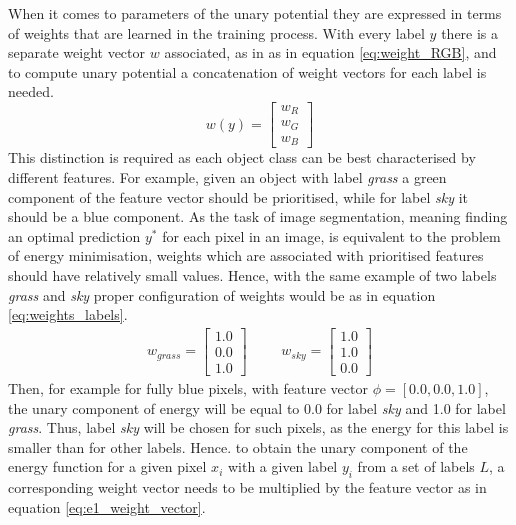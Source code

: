 When it comes to parameters of the unary potential they are expressed in terms of weights that are learned in the training process. With every label $y$ there is a separate weight vector $w$ associated, as in as in equation \ref{eq:weight_RGB}, and to compute unary potential a concatenation of weight vectors for each label is needed.
\begin{equation}
    \label{eq:weight_RGB}
     w(y) = \begin{bmatrix}
        w_R\\ 
        w_G\\ 
        w_B
    \end{bmatrix}
\end{equation}
This distinction is required as each object class can be best characterised by different features. For example, given an object with label \textit{grass} a green component of the feature vector should be prioritised, while for label \textit{sky} it should be a blue component. As the task of image segmentation, meaning finding an optimal prediction $y^*$ for each pixel in an image, is equivalent to the problem of energy minimisation, weights which are associated with prioritised features should have relatively small values. Hence, with the same example of two labels \textit{grass} and \textit{sky} proper configuration of weights would be as in equation \ref{eq:weights_labels}.
\begin{equation}
    \label{eq:weights_labels}
    \begin{matrix} 
        w_{grass} = \begin{bmatrix}
            1.0\\ 
            0.0\\ 
            1.0
            \end{bmatrix}  
        & & &
        w_{sky} = \begin{bmatrix}
            1.0\\ 
            1.0\\ 
            0.0
            \end{bmatrix} 
    \end{matrix}
\end{equation}
Then, for example for fully blue pixels, with feature vector $\phi = [0.0, 0.0, 1.0]$, the unary component of energy will be equal to 0.0 for label \textit{sky} and 1.0 for label \textit{grass}. Thus, label \textit{sky} will be chosen for such pixels, as the energy for this label is smaller than for other labels. 
Hence. to obtain the unary component of the energy function for a given pixel $x_i$ with a given label $y_i$ from a set of labels $L$, a corresponding weight vector needs to be multiplied by the feature vector as in equation \ref{eq:e1_weight_vector}. 
